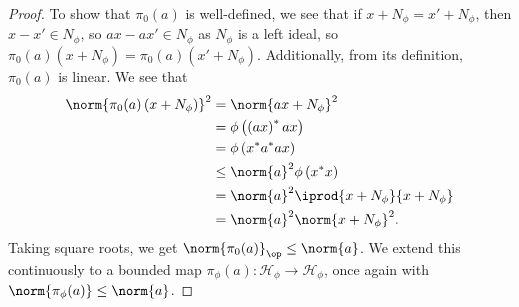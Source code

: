 \documentclass[10pt]{mypackage}
\begin{document}
\begin{proof}
  To show that $\pi_0(a)$ is well-defined, we see that if $x + N_{\phi} = x' + N_{\phi}$, then $x-x' \in N_{\phi}$, so $ax - ax'\in N_{\phi}$ as $N_{\phi}$ is a left ideal, so $\pi_0(a)(x + N_{\phi}) = \pi_0(a)(x' + N_{\phi})$. Additionally, from its definition, $\pi_0(a)$ is linear. We see that
  \begin{align*}
    \norm{\pi_0(a)\left(x + N_{\phi}\right)}^2 &= \norm{ax + N_{\phi}}^2\\
                                               &= \phi\left(\left(ax\right)^{\ast}ax\right)\\
                                               &= \phi\left(x^{\ast}a^{\ast}ax\right)\\
                                               &\leq \norm{a}^2\phi\left(x^{\ast}x\right)\\
                                               &= \norm{a}^2 \iprod{x + N_{\phi}}{x + N_{\phi}}\\
                                               &= \norm{a}^2\norm{x + N_{\phi}}^2.
  \end{align*}
  Taking square roots, we get $\norm{\pi_0(a)}_{\op}\leq \norm{a}$. We extend this continuously to a bounded map $\pi_{\phi}(a)\colon \mathcal{H}_{\phi}\rightarrow \mathcal{H}_{\phi}$, once again with $\norm{\pi_{\phi}(a)}\leq \norm{a}$.\newline


\end{proof}
\end{document}
